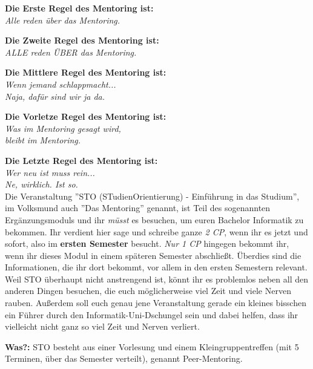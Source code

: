 \spaltenanfang
\textbf{Die Erste Regel des Mentoring ist:}\\ \textit{Alle reden über das Mentoring.}

\textbf{Die Zweite Regel des Mentoring ist:}\\ \textit{ALLE reden ÜBER das Mentoring.}

\textbf{Die Mittlere Regel des Mentoring ist:}\\ \textit{Wenn jemand schlappmacht...\\ Naja, dafür sind wir ja da.}

\textbf{Die Vorletze Regel des Mentoring ist:}\\ \textit{Was im Mentoring gesagt wird,\\ bleibt im Mentoring.}

\textbf{Die Letzte Regel des Mentoring ist:}\\ \textit{Wer neu ist muss rein...\\ Ne, wirklich. Ist so.}\\

Die Veranstaltung ''STO (STudienOrientierung) - Einführung in das Studium'', im Volksmund auch ''Das Mentoring'' genannt, ist Teil des sogenannten Ergänzungsmoduls und ihr \emph{müsst} es besuchen, um euren Bachelor Informatik zu bekommen. Ihr verdient hier sage und schreibe ganze \emph{2 CP}, wenn ihr es jetzt und sofort, also im \textbf{ersten Semester} besucht. \emph{Nur 1 CP} hingegen bekommt ihr, wenn ihr dieses Modul in einem späteren Semester abschließt. Überdies sind die Informationen, die ihr dort bekommt, vor allem in den ersten Semestern relevant. Weil STO überhaupt nicht anstrengend ist, könnt ihr es problemlos neben all den anderen Dingen besuchen, die euch möglicherweise viel Zeit und viele Nerven rauben. Außerdem soll euch genau jene Veranstaltung gerade ein kleines bisschen ein Führer durch den Informatik-Uni-Dschungel sein und dabei helfen, dass ihr vielleicht nicht ganz so viel Zeit und Nerven verliert. 

\textbf{Was?:} STO besteht aus einer Vorlesung und einem Kleingruppentreffen (mit 5 Terminen, über das Semester verteilt), genannt Peer-Mentoring. 


